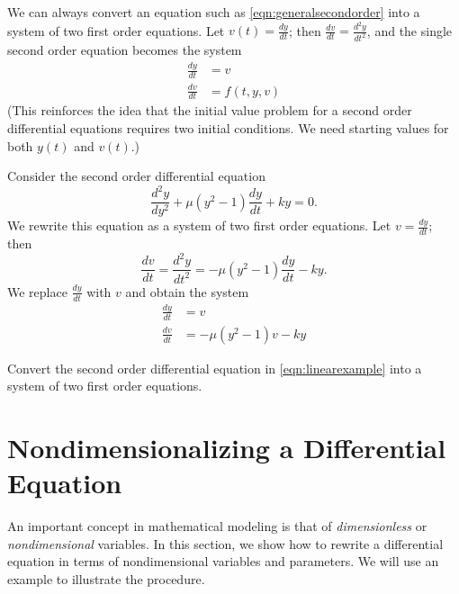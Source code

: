 We can always convert an equation such as
\eqref{eqn:generalsecondorder}
into a system of two first order equations.
Let $v(t) = \frac{dy}{dt}$; then
$\frac{dv}{dt} = \frac{d^2y}{dt^2}$, and the single second
order equation becomes the system
\begin{equation}
\begin{split}
   \frac{dy}{dt} & = v\\
   \frac{dv}{dt} & = f(t,y,v)
\end{split}
\end{equation}
(This reinforces the idea that the initial value problem
for a second order differential equations requires
two initial conditions.  We need starting values for
both $y(t)$ and $v(t)$.)
\begin{xexample}
Consider the second order differential equation
\begin{equation}
  \frac{d^2y}{dy^2} + \mu(y^2-1)\frac{dy}{dt} + k y = 0.
\end{equation}
We rewrite this equation as a system of two first order
equations.
Let $v = \frac{dy}{dt}$;
then
\begin{equation}
   \frac{dv}{dt} = \frac{d^2y}{dt^2} = -\mu(y^2-1)\frac{dy}{dt} - ky.
\end{equation}
We replace $\frac{dy}{dt}$ with $v$ and obtain the system
\begin{equation}
\begin{split}
   \frac{dy}{dt} & = v \\
   \frac{dv}{dt} & =  -\mu(y^2-1)v - ky
\end{split}
\end{equation}
\end{xexample}

\begin{exercises}
\begin{exercise}
Convert the second order differential equation 
in \eqref{eqn:linearexample} into a system of two first order equations.
\end{exercise}
\end{exercises}

\newpage

\section{Nondimensionalizing a Differential Equation}

An important concept in mathematical modeling
is that of \emph{dimensionless} or 
\emph{nondimensional} variables.
In this section, we show how to rewrite a differential
equation in terms of nondimensional variables and parameters.
We will use an example to illustrate the procedure.

